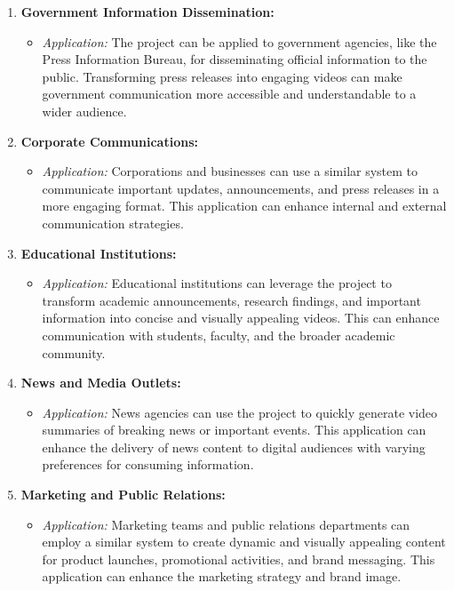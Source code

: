 \documentclass[12pt]{article}
\begin{document}
\begin{enumerate}[label=\arabic*.]
    \item \textbf{Government Information Dissemination:}
    \begin{itemize}
        \item \textit{Application:} The project can be applied to government agencies, like the Press Information Bureau, for disseminating official information to the public. Transforming press releases into engaging videos can make government communication more accessible and understandable to a wider audience.
    \end{itemize}

    \item \textbf{Corporate Communications:}
    \begin{itemize}
        \item \textit{Application:} Corporations and businesses can use a similar system to communicate important updates, announcements, and press releases in a more engaging format. This application can enhance internal and external communication strategies.
    \end{itemize}

    \item \textbf{Educational Institutions:}
    \begin{itemize}
        \item \textit{Application:} Educational institutions can leverage the project to transform academic announcements, research findings, and important information into concise and visually appealing videos. This can enhance communication with students, faculty, and the broader academic community.
    \end{itemize}

    \item \textbf{News and Media Outlets:}
    \begin{itemize}
        \item \textit{Application:} News agencies can use the project to quickly generate video summaries of breaking news or important events. This application can enhance the delivery of news content to digital audiences with varying preferences for consuming information.
    \end{itemize}

    \item \textbf{Marketing and Public Relations:}
    \begin{itemize}
        \item \textit{Application:} Marketing teams and public relations departments can employ a similar system to create dynamic and visually appealing content for product launches, promotional activities, and brand messaging. This application can enhance the marketing strategy and brand image.
    \end{itemize}
\end{enumerate}
\end{document}
